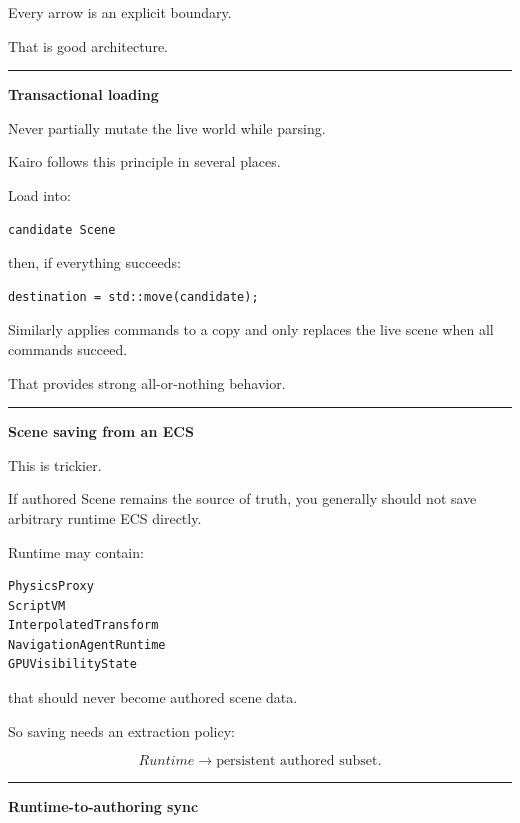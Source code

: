 Every arrow is an explicit boundary.

That is good architecture.

\begin{center}\rule{0.5\linewidth}{0.5pt}\end{center}

\textbf{Transactional loading}

Never partially mutate the live world while parsing.

Kairo follows this principle in several places.

Load into:

\begin{verbatim}
candidate Scene
\end{verbatim}

then, if everything succeeds:

\begin{verbatim}
destination = std::move(candidate);
\end{verbatim}

Similarly  applies commands to a copy and only replaces the live scene when all commands succeed.

That provides strong all-or-nothing behavior.

\begin{center}\rule{0.5\linewidth}{0.5pt}\end{center}

\textbf{Scene saving from an ECS}

This is trickier.

If authored Scene remains the source of truth, you generally should not save arbitrary runtime ECS directly.

Runtime may contain:

\begin{verbatim}
PhysicsProxy
ScriptVM
InterpolatedTransform
NavigationAgentRuntime
GPUVisibilityState
\end{verbatim}

that should never become authored scene data.

So saving needs an extraction policy:

\[
Runtime
\rightarrow
\text{persistent authored subset}.
\]

\begin{center}\rule{0.5\linewidth}{0.5pt}\end{center}

\textbf{Runtime-to-authoring sync}

